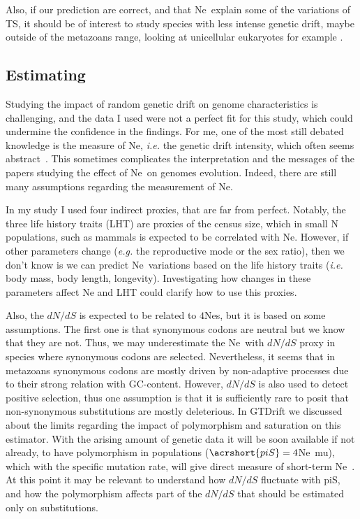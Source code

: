 Also, if our prediction are correct, and that \acrshort{Ne}~explain some of the variations of \acrshort{TS}, it should be of interest to study species with less intense \gls{genetic drift}, maybe outside of the metazoans range, looking at unicellular eukaryotes for example \citep{lynch_divergence_2023}.


\subsection{Estimating \Ne}

Studying the impact of random  \gls{genetic drift} on genome characteristics is challenging, and the data I used were not a perfect fit for this study, which could undermine the confidence in the findings. For me, one of the most still debated knowledge is the measure of \acrshort{Ne}, \textit{i.e.} the \gls{genetic drift} intensity, which often seems abstract~\citep{waples_what_2022}. This sometimes complicates the interpretation and the messages of the papers studying the effect of \acrshort{Ne}~on genomes evolution. Indeed, there are still many assumptions regarding the measurement of \acrshort{Ne}.

In my study I used four indirect proxies, that are far from perfect. Notably, the three life history traits (LHT) are proxies of the census size, which in small \acrshort{N} populations, such as mammals is expected to be correlated with \acrshort{Ne}. However, if other parameters change (\textit{e.g.} the reproductive mode or the sex ratio), then we don't know is we can predict \acrshort{Ne}~variations based on the life history traits (\textit{i.e.} body mass, body length, longevity). Investigating how changes in these parameters affect \acrshort{Ne} and LHT could clarify how to use this proxies.

Also, the $dN/dS$ is expected to be related to $4$\acrshort{Ne}\acrshort{s}, but it is based on some assumptions. The first one is that \gls{synonymous} codons are neutral but we know that they are not. Thus, we may underestimate the \acrshort{Ne}~with $dN/dS$ proxy in species where \gls{synonymous} codons are selected. Nevertheless, it seems that in metazoans \gls{synonymous} codons are mostly driven by non-adaptive processes due to their strong relation with \gls{GC-content}. However, $dN/dS$ is also used to detect positive selection, thus one assumption is that it is sufficiently rare to posit that \gls{non-synonymous} \gls{substitution}s are mostly deleterious. In GTDrift we discussed about the limits regarding the impact of polymorphism and saturation on this estimator. With the arising amount of genetic data it will be soon available if not already, to have polymorphism in populations ($\acrshort{piS} = 4$\acrshort{Ne}~\acrshort{mu}), which with the specific mutation rate, will give direct measure of short-term \acrshort{Ne}~\citep{lynch_divergence_2023}. At this point it may be relevant to understand how $dN/dS$ fluctuate with \acrshort{piS}, and how the polymorphism affects part of the $dN/dS$ that should be estimated only on substitutions.

